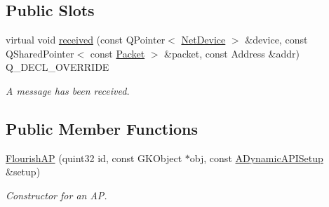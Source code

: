 \subsection*{Public Slots}
\begin{DoxyCompactItemize}
\item 
virtual void \hyperlink{classFlourishAP_acff41fd22ca0610c85f170a68897a502}{received} (const Q\+Pointer$<$ \hyperlink{classNetDevice}{Net\+Device} $>$ \&device, const Q\+Shared\+Pointer$<$ const \hyperlink{group__V2XFramework_ga1b82bfc289dbcb9aced56200d7abc964}{Packet} $>$ \&packet, const Address \&addr) Q\+\_\+\+D\+E\+C\+L\+\_\+\+O\+V\+E\+R\+R\+I\+DE
\begin{DoxyCompactList}\small\item\em A message has been received. \end{DoxyCompactList}\end{DoxyCompactItemize}
\subsection*{Public Member Functions}
\begin{DoxyCompactItemize}
\item 
\hyperlink{classFlourishAP_a12e96b3386fbd07beb0602c49a395f93}{Flourish\+AP} (quint32 id, const G\+K\+Object $\ast$obj, const \hyperlink{classADynamicAPISetup}{A\+Dynamic\+A\+P\+I\+Setup} \&setup)
\begin{DoxyCompactList}\small\item\em Constructor for an AP. \end{DoxyCompactList}\end{DoxyCompactItemize}
